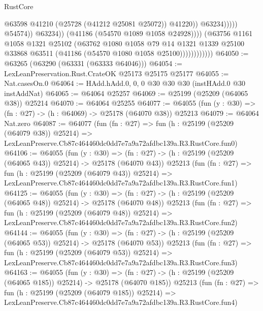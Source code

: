 \begin{lexlean}{RustCore}
\begin{coremodule}
                                              @63598
                                              @41210
                                              (@25728 (@41212 @25081 @25072))
                                              @41220))
                                          @63234)))))
                                @54574))
                            @63234))
                        (@41186 (@54570 @1089 @1058 @24928))))
                    (@63756
                      @1161
                      @1058
                      @1321
                      @25102
                      (@63762
                        @1080
                        @1058
                        @79
                        @14
                        @1321
                        @1339
                        @25100
                        @33868
                        @63511
                        (@41186 (@54570 @1080 @1058 @25100))))))))))))
@64050 := @63265 (@63290 (@63331 (@63333 @64046)))
@64054 := LexLeanPreservation.Rust.CrateOK @25173 @25175 @25177
@64055 := Nat.casesOn.{0}
@64064 := HAdd.hAdd.{0, 0, 0} @30 @30 @30 (instHAdd.{0} @30 instAddNat)
@64065 := @64064 @25257
@64069 := @25199 (@25209 (@64065 @38)) @25214
@64070 := @64064 @25255
@64077 := @64055 (fun (y : @30) => (fn : @27) -> (h : @64069) -> @25178 (@64070 @38)) @25213
@64079 := @64064 Nat.zero
@64087 := @64077
    (fun (fn : @27) =>
    fun (h : @25199 (@25209 (@64079 @38)) @25214) =>
    LexLeanPreserve.Cb87c464460dc0dd7e7a9a72afdbc139a.R3.RustCore.fun0)
@64106 := @64055
    (fun (y : @30) =>
    (fn : @27) -> (h : @25199 (@25209 (@64065 @43)) @25214) -> @25178 (@64070 @43))
    @25213
    (fun (fn : @27) =>
    fun (h : @25199 (@25209 (@64079 @43)) @25214) =>
    LexLeanPreserve.Cb87c464460dc0dd7e7a9a72afdbc139a.R3.RustCore.fun1)
@64125 := @64055
    (fun (y : @30) =>
    (fn : @27) -> (h : @25199 (@25209 (@64065 @48)) @25214) -> @25178 (@64070 @48))
    @25213
    (fun (fn : @27) =>
    fun (h : @25199 (@25209 (@64079 @48)) @25214) =>
    LexLeanPreserve.Cb87c464460dc0dd7e7a9a72afdbc139a.R3.RustCore.fun2)
@64144 := @64055
    (fun (y : @30) =>
    (fn : @27) -> (h : @25199 (@25209 (@64065 @53)) @25214) -> @25178 (@64070 @53))
    @25213
    (fun (fn : @27) =>
    fun (h : @25199 (@25209 (@64079 @53)) @25214) =>
    LexLeanPreserve.Cb87c464460dc0dd7e7a9a72afdbc139a.R3.RustCore.fun3)
@64163 := @64055
    (fun (y : @30) =>
    (fn : @27) -> (h : @25199 (@25209 (@64065 @185)) @25214) -> @25178 (@64070 @185))
    @25213
    (fun (fn : @27) =>
    fun (h : @25199 (@25209 (@64079 @185)) @25214) =>
    LexLeanPreserve.Cb87c464460dc0dd7e7a9a72afdbc139a.R3.RustCore.fun4)

\end{coremodule}
\end{lexlean}
